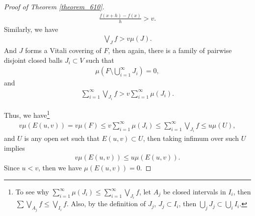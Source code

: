 \documentclass[11pt]{book}
\theoremstyle{definition}
\numberwithin{equation}{chapter}
\begin{document}
\begin{proof}[Proof of Theorem \ref{theorem_610}]
\begin{align*}
    \frac{f(x+h) - f(x)}{h} > v.
\end{align*}
Similarly, we have
\begin{align*}
    \bigvee_J f > v \mu(J).
\end{align*}
And $J$ forms a Vitali covering of $F$, then again, there is a family of pairwise disjoint closed balls $J_i \subset V$ such that
\begin{align*}
    \mu\left(F \setminus \bigcup^\infty_{i=1} J_i\right) = 0,
\end{align*}
and
\begin{align*}
    \sum^\infty_{i=1} \bigvee_{J_i} f > v \sum^\infty_{i=1} \mu(J_i).
\end{align*}

Thus, we have\footnote{To see why $\sum^\infty_{i=1} \mu(J_i) \leq \sum^\infty_{i=1} \bigvee_{J_i} f$, let $A_j$ be closed intervals in $I_i$, then $\sum \bigvee_{A_j} f \leq \bigvee_{I_i} f$. Also, by the definition of $J_j$, $J_j \subset I_i$, then $\bigcup_j J_j \subset \bigcup_i I_i$.}
\begin{align*}
    v \mu(E(u,v)) = v \mu(F) \leq v \sum^\infty_{i=1} \mu(J_i) \leq \sum^\infty_{i=1} \bigvee_{J_i} f \leq u \mu(U),
\end{align*}
and $U$ is any open set such that $E(u,v) \subset U$, then taking infimum over such $U$ implies 
\begin{align*}
    v \mu(E(u,v)) \leq u \mu(E(u,v)).
\end{align*}
Since $u < v$, then we have $\mu(E(u,v)) = 0$.
\end{proof}

\medskip
\end{document}
